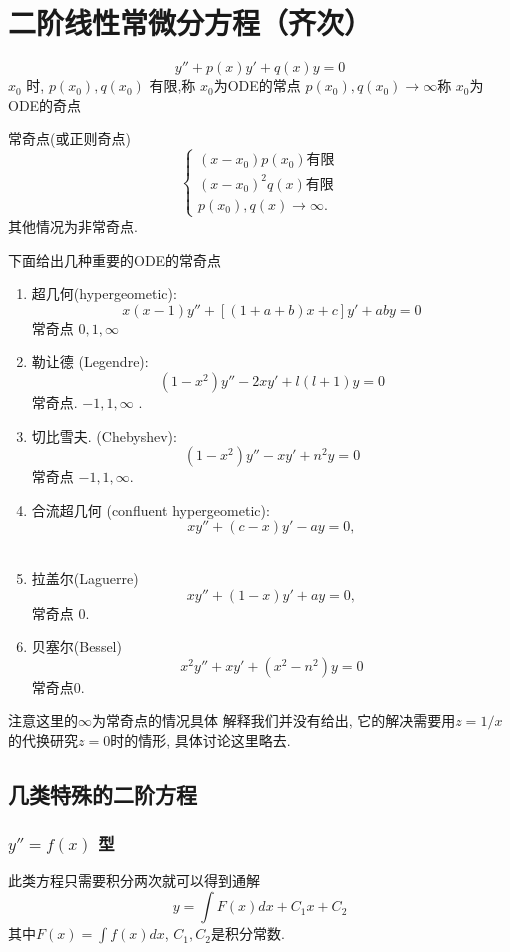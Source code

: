
\section{二阶线性常微分方程（齐次）}
$$
y''+p(x) y '+q(x) y=0
$$
$x_0$ 时, $p\left(x_0\right), q\left(x_0\right)$ 有限,称 $x_0$为ODE的常点
$p\left(x_0\right), q\left(x_0\right) \rightarrow \infty$称 $x_0$为ODE的奇点

常奇点(或正则奇点) $$\left\{\begin{array}{l}
    \left(x-x_0\right) p\left(x_0\right) \text{有限}
    \\
    \left(x-x_0\right)^2 q(x) \text{有限}
    \\ p\left(x_0\right), q(x) \rightarrow \infty .\end{array}
    \right.$$
其他情况为非常奇点.


下面给出几种重要的ODE的常奇点
\begin{enumerate}
    \item 超几何(hypergeometic):
    $$
    x(x-1) y''+[(1+a+b) x+c] y'+a b y= 0
    $$
    常奇点 $0,1, \infty$\\
    \item 勒让德 (Legendre):
    $$
    \left(1-x^2\right) y''-2 x y'+l(l+1) y=0
    $$
    常奇点. $-1,1, \infty$ .\\
    \item  切比雪夫. (Chebyshev):
    $$
    \left(1-x^2\right) y''-x y'+n^2 y=0 
    $$
    常奇点 $-1,1, \infty$.\\

    \item  合流超几何 (confluent hypergeometic):
    $$
    x y''+(c-x) y'-a y=0,
    $$
    \\
    \item 拉盖尔(Laguerre)
    $$
    x y''+(1-x) y'+a y=0,
    $$
    常奇点 $0$.
    \item 贝塞尔(Bessel)
    $$
    x^2 y'' + xy' + (x^2 - n^2) y = 0
    $$
    常奇点$0$.
\end{enumerate}
\begin{note}
    注意这里的$\infty$为常奇点的情况具体
    解释我们并没有给出, 它的解决需要用$z=1/x$的代换研究$z=0$时的情形, 具体讨论这里略去.
\end{note}

\subsection{几类特殊的二阶方程}
\subsubsection{ $y'' = f(x)$ 型}
此类方程只需要积分两次就可以得到通解
\begin{equation}
    y = \int F(x) dx + C_1 x + C_2
\end{equation}
其中$F(x) = \int f(x) dx$, $C_1, C_2$是积分常数.
